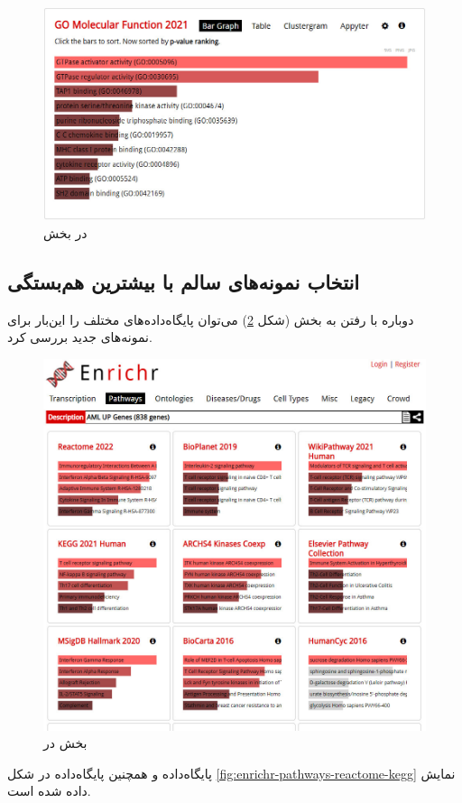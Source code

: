 \documentclass{article}
\begin{document}
\begin{figure}[h!]
	\centering
	\includegraphics[width=0.5\columnwidth]{figs/enrichr-ontologies-mf.jpg}
	\caption{ در بخش }
	\label{fig:enrichr-ontology-mf}
\end{figure}

\subsection{انتخاب نمونه‌های سالم با بیشترین هم‌بستگی}
دوباره با رفتن به بخش  (شکل \ref{fig:enrichr-pathways-2}) می‌توان پایگاه‌داده‌های  مختلف را این‌بار برای نمونه‌های جدید بررسی کرد.
\begin{figure}[h!]
	\centering
	\includegraphics[width=0.5\columnwidth]{figs/enrichr-pathways-2.jpg}
	\caption{بخش  در }
	\label{fig:enrichr-pathways-2}
\end{figure}

پایگاه‌داده  و همچنین پایگاه‌داده  در شکل \ref{fig:enrichr-pathways-reactome-kegg} نمایش داده شده است.
\end{document}
